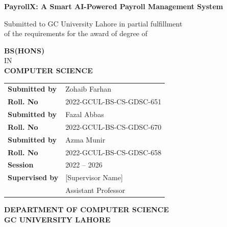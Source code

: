 \documentclass[12pt,a4paper]{report}
\begin{document}
\begin{titlepage}
    \centering
    \vspace*{1cm}

    {\Large\bfseries PayrollX: A Smart AI-Powered Payroll Management System\\}
    \vspace{1cm}

    {\large Submitted to GC University Lahore in partial fulfillment\\
    of the requirements for the award of degree of\\}
    \vspace{1.5cm}

    {\Large\bfseries BS(HONS)\\}
    \vspace{0.3cm}
    {\Large IN\\}
    \vspace{0.3cm}
    {\Large\bfseries COMPUTER SCIENCE\\}

    \vspace{1.5cm}

    \begin{tabular}{ll}
        \textbf{Submitted by} & Zohaib Farhan \\
        \textbf{Roll. No}     & 2022-GCUL-BS-CS-GDSC-651 \\[0.3cm]
        \textbf{Submitted by} & Fazal Abbas \\
        \textbf{Roll. No}     & 2022-GCUL-BS-CS-GDSC-670 \\[0.3cm]
        \textbf{Submitted by} & Azma Munir \\
        \textbf{Roll. No}     & 2022-GCUL-BS-CS-GDSC-658 \\[0.4cm]
        \textbf{Session}      & 2022 -- 2026 \\[0.4cm]
        \textbf{Supervised by}& {[}Supervisor Name{]} \\
                              & Assistant Professor \\
    \end{tabular}

    \vfill

    {\Large\bfseries DEPARTMENT OF COMPUTER SCIENCE\\}
    \vspace{0.3cm}
    {\Large\bfseries GC UNIVERSITY LAHORE\\}
\end{titlepage}
\end{document}
